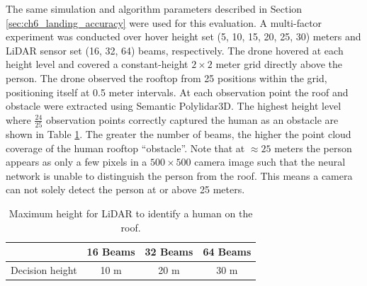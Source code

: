 The same simulation and algorithm parameters described in Section \ref{sec:ch6_landing_accuracy} were used for this evaluation. A multi-factor experiment was conducted over hover height set (5, 10, 15, 20, 25, 30) meters and LiDAR sensor set (16, 32, 64) beams, respectively. The drone hovered at each height level and covered a constant-height $2\times2$ meter grid directly above the person. The drone observed the rooftop from 25 positions within the grid, positioning itself at 0.5 meter intervals. At each observation point the roof and obstacle were extracted using Semantic Polylidar3D. The highest height level where $\frac{24}{25}$ observation points correctly captured the human as an obstacle are shown in Table \ref{table:decision_height}. The greater the number of beams, the higher the point cloud coverage of the human rooftop ``obstacle''. Note that at $\approx 25$ meters the person appears as only a few pixels in a $500\times500$ camera image such that the neural network is unable to distinguish the person from the roof. This means a camera can not solely detect the person at or above 25 meters.

\begin{table}[!ht]
\centering
\caption{Maximum height for LiDAR to identify a human on the roof.} \label{table:decision_height}
\begin{tabular}{@{}cccc@{}}
\toprule
                & 16 Beams & 32 Beams & 64 Beams \\ \midrule
Decision height & 10 m     & 20 m     & 30 m     \\ \bottomrule
\end{tabular}
\end{table}

